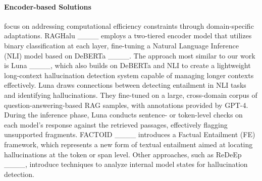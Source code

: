 \paragraph{Encoder-based Solutions} focus on addressing computational efficiency constraints through domain-specific adaptations. RAGHalu ____ employs a two-tiered encoder model that utilizes binary classification at each layer, fine-tuning a Natural Language Inference (NLI) model based on DeBERTa ____. The approach most similar to our work is Luna ____, which also builds on DeBERTa and NLI to create a lightweight long-context hallucination detection system capable of managing longer contexts effectively. Luna draws connections between detecting entailment in NLI tasks and identifying hallucinations. They fine-tuned on a large, cross-domain corpus of question-answering-based RAG samples, with annotations provided by GPT-4. During the inference phase, Luna conducts sentence- or token-level checks on each model's response against the retrieved passages, effectively flagging unsupported fragments. FACTOID ____ introduces a Factual Entailment (FE) framework, which represents a new form of textual entailment aimed at locating hallucinations at the token or span level. Other approaches, such as ReDeEp ____, introduce techniques to analyze internal model states for hallucination detection.